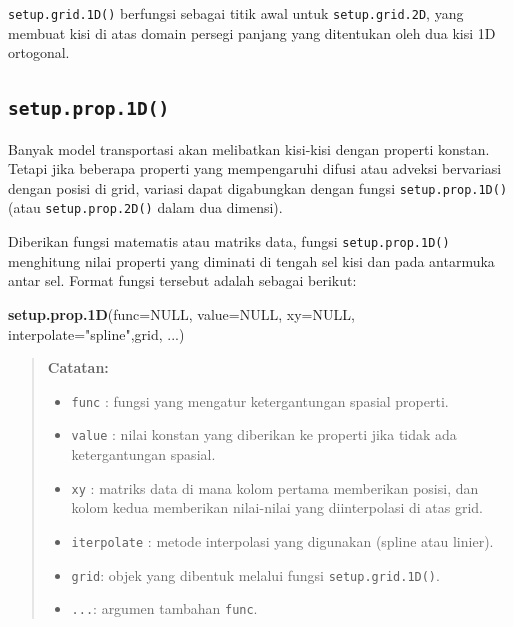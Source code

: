 \documentclass[
]{book}
\newenvironment{Shaded}{\begin{snugshade}}{\end{snugshade}}
\newcommand{\AttributeTok}[1]{\textcolor[rgb]{0.13,0.29,0.53}{#1}}
\newcommand{\ConstantTok}[1]{\textcolor[rgb]{0.56,0.35,0.01}{#1}}
\newcommand{\FunctionTok}[1]{\textcolor[rgb]{0.13,0.29,0.53}{\textbf{#1}}}
\newcommand{\NormalTok}[1]{#1}
\newcommand{\StringTok}[1]{\textcolor[rgb]{0.31,0.60,0.02}{#1}}
\providecommand{\tightlist}{%
  \setlength{\itemsep}{0pt}\setlength{\parskip}{0pt}}
\theoremstyle{definition}
\theoremstyle{definition}
\theoremstyle{definition}
\theoremstyle{definition}
\theoremstyle{remark}
\begin{document}
\texttt{setup.grid.1D()} berfungsi sebagai titik awal untuk \texttt{setup.grid.2D}, yang membuat kisi di atas domain persegi panjang yang ditentukan oleh dua kisi 1D ortogonal.

\hypertarget{setup.prop.1d}{%
\subsection{\texorpdfstring{\texttt{setup.prop.1D()}}{setup.prop.1D()}}\label{setup.prop.1d}}

Banyak model transportasi akan melibatkan kisi-kisi dengan properti konstan. Tetapi jika beberapa properti yang mempengaruhi difusi atau adveksi bervariasi dengan posisi di grid, variasi dapat digabungkan dengan fungsi \texttt{setup.prop.1D()} (atau \texttt{setup.prop.2D()} dalam dua dimensi).

Diberikan fungsi matematis atau matriks data, fungsi \texttt{setup.prop.1D()} menghitung nilai properti yang diminati di tengah sel kisi dan pada antarmuka antar sel. Format fungsi tersebut adalah sebagai berikut:

\begin{Shaded}
\begin{Highlighting}[]
\FunctionTok{setup.prop.1D}\NormalTok{(}\AttributeTok{func=}\ConstantTok{NULL}\NormalTok{, }\AttributeTok{value=}\ConstantTok{NULL}\NormalTok{, }\AttributeTok{xy=}\ConstantTok{NULL}\NormalTok{,}
              \AttributeTok{interpolate=}\StringTok{"spline"}\NormalTok{,grid, ...)}
\end{Highlighting}
\end{Shaded}

\begin{quote}
\textbf{Catatan:}

\begin{itemize}
\tightlist
\item
  \texttt{func} : fungsi yang mengatur ketergantungan spasial properti.
\item
  \texttt{value} : nilai konstan yang diberikan ke properti jika tidak ada ketergantungan spasial.
\item
  \texttt{xy} : matriks data di mana kolom pertama memberikan posisi, dan kolom kedua memberikan nilai-nilai yang diinterpolasi di atas grid.
\item
  \texttt{iterpolate} : metode interpolasi yang digunakan (spline atau linier).
\item
  \texttt{grid}: objek yang dibentuk melalui fungsi \texttt{setup.grid.1D()}.
\item
  \texttt{...}: argumen tambahan \texttt{func}.
\end{itemize}
\end{quote}
\end{document}
